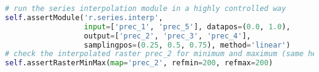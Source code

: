 \documentclass{standalone}
\begin{document}
\begin{lstlisting}[language=Python,linewidth=44.2em]
# run the series interpolation module in a highly controlled way
self.assertModule('r.series.interp',
                  input=['prec_1', 'prec_5'], datapos=(0.0, 1.0),
                  output=['prec_2', 'prec_3', 'prec_4'],
                  samplingpos=(0.25, 0.5, 0.75), method='linear')
# check the interpolated raster prec_2 for minimum and maximum (same here)
self.assertRasterMinMax(map='prec_2', refmin=200, refmax=200)
\end{lstlisting}
\end{document}
